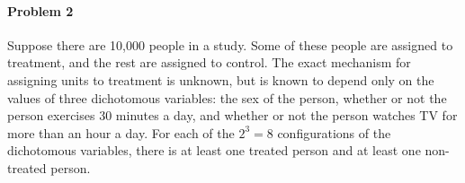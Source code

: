 \documentclass{article}
\begin{document}
\paragraph{Problem 2}


    Suppose there are 10,000 people in a study.
    Some of these people are assigned to treatment, and the rest are assigned to control.
    The exact mechanism for assigning units to treatment is unknown,
    but is known to depend only on the values of three dichotomous variables:
    the sex of the person, 
    whether or not the person exercises 30 minutes a day, 
    and whether or not the person watches TV for more than an hour a day.
    For each of the $2^3 = 8$ configurations of the dichotomous variables, 
    there is at least one treated person and at least one non-treated person.
\end{document}
